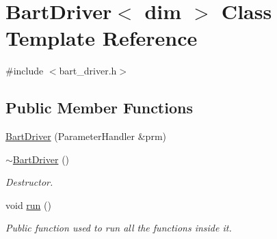 \hypertarget{class_bart_driver}{}\section{Bart\+Driver$<$ dim $>$ Class Template Reference}
\label{class_bart_driver}


{\ttfamily \#include $<$bart\+\_\+driver.\+h$>$}

\subsection*{Public Member Functions}
\begin{DoxyCompactItemize}
\item 
\hyperlink{class_bart_driver_acad3b3200543d46ab9e4c78b860f822c}{Bart\+Driver} (Parameter\+Handler \&prm)
\item 
\hyperlink{class_bart_driver_aa89fe626d99cb4013b83d5e99698a9f3}{$\sim$\+Bart\+Driver} ()
\begin{DoxyCompactList}\small\item\em Destructor. \end{DoxyCompactList}\item 
void \hyperlink{class_bart_driver_a20c70ef3733fc4406353e6fdfee6c684}{run} ()
\begin{DoxyCompactList}\small\item\em Public function used to run all the functions inside it. \end{DoxyCompactList}\end{DoxyCompactItemize}
